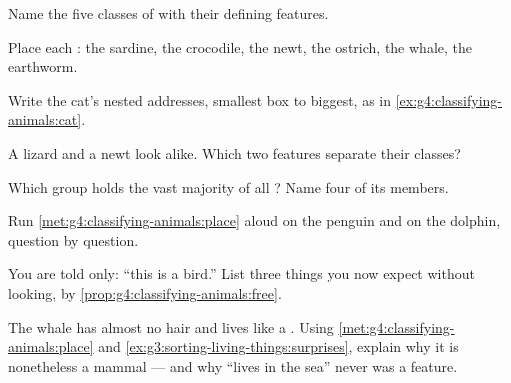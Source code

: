 \begin{exercise}[$\star$]\label{exo:g4:classifying-animals:2}
Name the five classes of  with their defining
features.
\end{exercise}

\begin{exercise}[$\star$]\label{exo:g4:classifying-animals:3}
Place each : the sardine, the crocodile, the newt, the
ostrich, the whale, the earthworm.
\end{exercise}

\begin{exercise}[$\star$]\label{exo:g4:classifying-animals:4}
Write the cat's nested addresses, smallest box to biggest, as in
\cref{ex:g4:classifying-animals:cat}.
\end{exercise}

\begin{exercise}[$\star$]\label{exo:g4:classifying-animals:5}
A lizard and a newt look alike. Which two features separate
their classes?
\end{exercise}

\begin{exercise}[$\star$]\label{exo:g4:classifying-animals:6}
Which group holds the vast majority of all ? Name four of
its members.
\end{exercise}

\begin{exercise}[$\star$]\label{exo:g4:classifying-animals:7}
Run \cref{met:g4:classifying-animals:place} aloud on the
penguin and on the dolphin, question by question.
\end{exercise}

\begin{exercise}[$\star$]\label{exo:g4:classifying-animals:8}
You are told only: ``this  is a bird.'' List three things
you now expect without looking, by
\cref{prop:g4:classifying-animals:free}.
\end{exercise}

\begin{exercise}[$\star\star$]\label{exo:g4:classifying-animals:9}
The whale has almost no hair and lives like a . Using
\cref{met:g4:classifying-animals:place} and
\cref{ex:g3:sorting-living-things:surprises}, explain why it is
nonetheless a mammal --- and why ``lives in the sea'' never
was a  feature.
\end{exercise}

